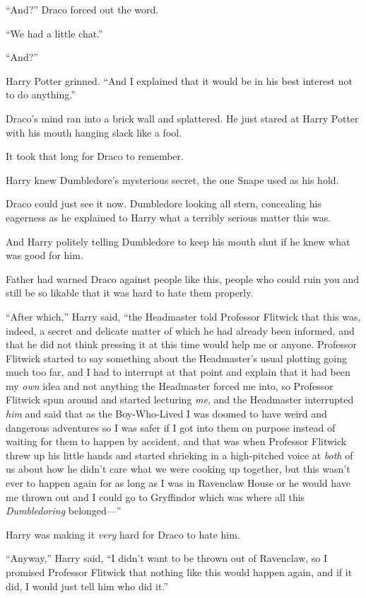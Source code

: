 “And?” Draco forced out the word.

“We had a little chat.”

“And?”

Harry Potter grinned. “And I explained that it would be in his best interest not to do anything.”

Draco’s mind ran into a brick wall and splattered. He just stared at Harry Potter with his mouth hanging slack like a fool.

It took that long for Draco to remember.

Harry knew Dumbledore’s mysterious secret, the one Snape used as his hold.

Draco could just see it now. Dumbledore looking all stern, concealing his eagerness as he explained to Harry what a terribly serious matter this was.

And Harry politely telling Dumbledore to keep his mouth shut if he knew what was good for him.

Father had warned Draco against people like this, people who could ruin you and still be so likable that it was hard to hate them properly.

“After which,” Harry said, “the Headmaster told Professor Flitwick that this was, indeed, a secret and delicate matter of which he had already been informed, and that he did not think pressing it at this time would help me or anyone. Professor Flitwick started to say something about the Headmaster’s usual plotting going much too far, and I had to interrupt at that point and explain that it had been my \emph{own} idea and not anything the Headmaster forced me into, so Professor Flitwick spun around and started lecturing \emph{me}, and the Headmaster interrupted \emph{him} and said that as the Boy-Who-Lived I was doomed to have weird and dangerous adventures so I was safer if I got into them on purpose instead of waiting for them to happen by accident, and that was when Professor Flitwick threw up his little hands and started shrieking in a high-pitched voice at \emph{both} of us about how he didn’t care what we were cooking up together, but this wasn’t ever to happen again for as long as I was in Ravenclaw House or he would have me thrown out and I could go to Gryffindor which was where all this \emph{Dumbledoring} belonged—”

Harry was making it \emph{very} hard for Draco to hate him.

“Anyway,” Harry said, “I didn’t want to be thrown out of Ravenclaw, so I promised Professor Flitwick that nothing like this would happen again, and if it did, I would just tell him who did it.”

